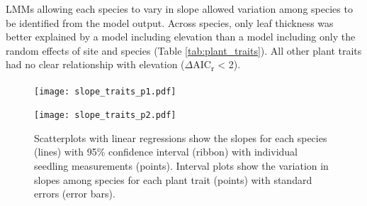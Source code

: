 \documentclass[a4paper,10pt,]{report}
\begin{document}
LMMs allowing each species to vary in slope allowed variation among species to be identified from the model output. Across species, only leaf thickness was better explained by a model including elevation than a model including only the random effects of site and species (Table \ref{tab:plant_traits}). All other plant traits had no clear relationship with elevation ($\Delta$AIC\textsubscript{r} < 2).

\begin{figure}[H]
\centering
\texttt{[image: slope\_traits\_p1.pdf]}
\end{figure}
\vspace{-1cm}
\begin{figure}[H]
\centering
\texttt{[image: slope\_traits\_p2.pdf]}
\caption{Scatterplots with linear regressions show the slopes for each species (lines) with 95\% confidence interval (ribbon) with individual seedling measurements (points). Interval plots show the variation in slopes among species for each plant trait (points) with standard errors (error bars).}
\label{fig:trait_elev}
\end{figure}
\end{document}
